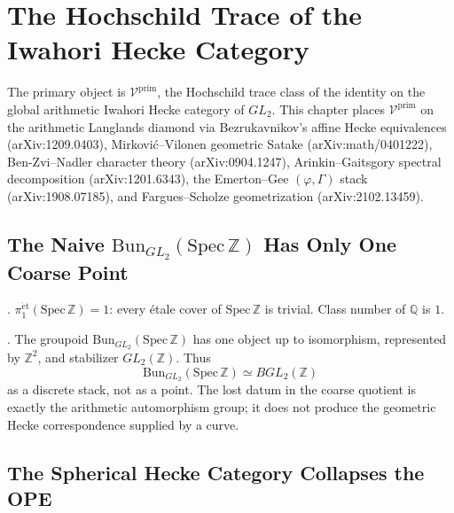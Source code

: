 \chapter{The Hochschild Trace of the Iwahori Hecke Category}
\label{v4-arith:hochschild-trace}

The primary object is \(\mathcal{V}^{\mathrm{prim}}\), the Hochschild
trace class of the identity on the global arithmetic Iwahori Hecke
category of \(GL_2\). This chapter places \(\mathcal{V}^{\mathrm{prim}}\)
on the arithmetic Langlands diamond via Bezrukavnikov's affine Hecke
equivalences (arXiv:1209.0403), Mirko\-vi\'c--Vilonen geometric Satake
(arXiv:math/0401222), Ben-Zvi--Nadler character theory
(arXiv:0904.1247), Arinkin--Gaitsgory spectral decomposition
(arXiv:1201.6343), the Emerton--Gee \((\varphi,\Gamma)\) stack
(arXiv:1908.07185), and Fargues--Scholze geometrization
(arXiv:2102.13459).

\section{The Naive \(\mathrm{Bun}_{GL_{2}}(\mathrm{Spec}\,\mathbb{Z})\) Has Only One Coarse Point}
\label{v4-arith:bb:bun-is-point}

\begin{theorem}[Minkowski]
\label{v4-arith:thm:minkowski}
\ClaimStatusProvedElsewhere. \(\pi_{1}^{\mathrm{\acute{e}t}}(\mathrm{Spec}\,\mathbb{Z})=1\):
every \'etale cover of \(\mathrm{Spec}\,\mathbb{Z}\) is trivial. Class
number of \(\mathbb{Q}\) is \(1\).
\end{theorem}

\begin{corollary}
\label{v4-arith:cor:Bun-GL2-is-point}
\ClaimStatusProvedHere. The groupoid
\(\mathrm{Bun}_{GL_{2}}(\mathrm{Spec}\,\mathbb{Z})\) has one object up
to isomorphism, represented by \(\mathbb{Z}^{2}\), and stabilizer
\(GL_{2}(\mathbb{Z})\). Thus
\[
\mathrm{Bun}_{GL_{2}}(\mathrm{Spec}\,\mathbb{Z})\simeq BGL_{2}(\mathbb{Z})
\]
as a discrete stack, not as a point. The lost datum in the coarse
quotient is exactly the arithmetic automorphism group; it does not
produce the geometric Hecke correspondence supplied by a curve.
\end{corollary}

\section{The Spherical Hecke Category Collapses the OPE}
\label{v4-arith:bb:spherical-collapses-OPE}

